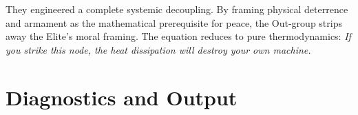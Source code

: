 They engineered a complete systemic decoupling. By framing physical deterrence and armament as the mathematical prerequisite for peace, the Out-group strips away the Elite's moral framing. The equation reduces to pure thermodynamics: \textit{If you strike this node, the heat dissipation will destroy your own machine.}

\part{Diagnostics and Output}
\label{part:diagnostics}

